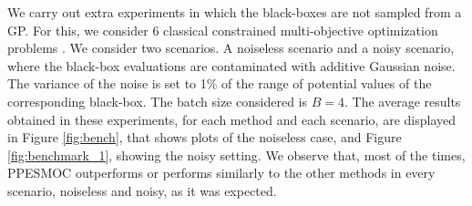 We carry out extra experiments in which the black-boxes are not sampled from a 
GP. For this, we consider 6 classical constrained multi-objective optimization 
problems \citep{chafekar2003constrained}. We consider two scenarios. A noiseless scenario and a
noisy scenario, where the black-box evaluations are contaminated with 
additive Gaussian noise. The variance of the noise is set to 1\% of
the range of potential values of the corresponding black-box.
The batch size considered is $B=4$.
The average results obtained in these experiments, for each method and each scenario, 
are displayed in Figure \ref{fig:bench}, that shows plots of the noiseless case, and Figure \ref{fig:benchmark_1}, showing the noisy setting. We observe that, most of the times, PPESMOC outperforms or performs similarly to the other methods in every scenario, noiseless and noisy, as it was expected. 

